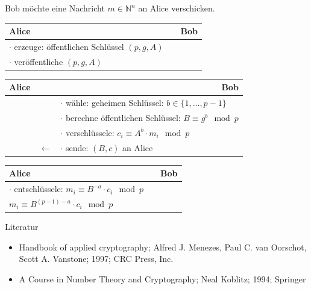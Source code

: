 \documentclass[utf8]{beamer}
\newcommand{\N}{\mathbb{N}}
\begin{document}
\begin{frame}{\insertsubsectionhead}
  Bob möchte eine Nachricht $m \in \N^n$ an Alice verschicken.

  \pause

  \begin{center}
    \begin{tabularx}{\textwidth}{Xcl}
      \textbf{Alice} & & \textbf{Bob}\\\midrule
      $\cdot$ erzeuge: öffentlichen Schlüssel $(p, g, A)$\\
      $\cdot$ veröffentliche $(p, g, A)$
    \end{tabularx}
  \end{center}

  \pause

  \begin{center}
    \begin{tabularx}{\textwidth}{lcX}
      \textbf{Alice} &  & \multicolumn{1}{r}{\textbf{Bob}}\\\midrule
      & & $\cdot$ wähle: geheimen Schlüssel: $b\in \{ 1 ,\ldots , p - 1 \}$\\
      & & $\cdot$ berechne öffentlichen Schlüssel: $B \equiv g^b \mod p$\\
      & & $\cdot$ verschlüssele: $c_i \equiv A^b \cdot m_i \mod p$\\
      & $\leftarrow$ & $\cdot$ sende: $(B, c)$ an Alice
    \end{tabularx}
  \end{center}

  \pause

  \begin{center}
    \begin{tabularx}{\textwidth}{Xcl}
      \textbf{Alice} &  & \textbf{Bob}\\\midrule
      $\cdot$ entschlüssele: $m_i \equiv B^{-a} \cdot c_i \mod p$\\
      $m_i \equiv B^{(p-1)-a} \cdot c_i \mod p$
    \end{tabularx}
  \end{center}
\end{frame}

\begin{frame}[t]{Literatur}
  \begin{itemize}
    \item Handbook of applied cryptography; Alfred J. Menezes, Paul C. van
      Oorschot, Scott A. Vanstone; 1997; CRC Press, Inc.
    \item A Course in Number Theory and Cryptography; Neal Koblitz; 1994;
      Springer
  \end{itemize}
\end{frame}
\end{document}
